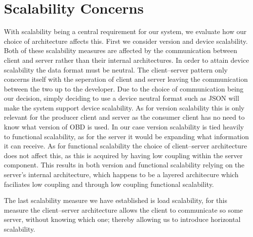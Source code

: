 \section{Scalability Concerns}
With scalability being a central requirement for our system, we evaluate how our choice of architecture affects this.
First we consider version and device scalability.
Both of these scalability measures are affected by the communication between client and server rather than their internal architectures.
In order to attain device scalability the data format must be neutral.
The client--server pattern only concerns itself with the seperation of client and server leaving the communication between the two up to the developer.
Due to the choice of communication being our decision, simply deciding to use a device neutral format such as JSON will make the system support device scalability.
As for version scalability this is only relevant for the producer client and server as the consumer client has no need to know what version of \ac{OBD} is used.
In our case version scalability is tied heavily to functional scalability, as for the server it would be expanding what information it can receive.
As for functional scalability the choice of client--server architecture does not affect this, as this is acquired by having low coupling within the server component.
This results in both version and functional scalability relying on the server's internal architecture, which happens to be a layered architecure which faciliates low coupling and through low coupling functional scalability.

The last scalability measure we have established is load scalability, for this measure the client--server architecture allows the client to communicate so some server, without knowing which one; thereby allowing us to introduce horizontal scalability.

